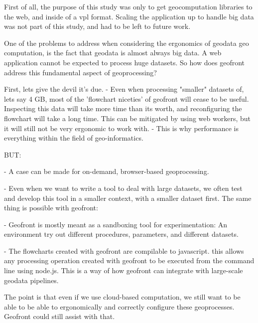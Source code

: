 
First of all, the purpose of this study was only to get geocomputation libraries to the web, and inside of a vpl format. 
Scaling the application up to handle big data was not part of this study, and had to be left to future work.  

One of the problems to address when considering the ergonomics of geodata geo computation, is the fact that geodata is almost always big data. 
A web application cannot be expected to process huge datasets. 
So how does geofront address this fundamental aspect of geoprocessing? 

First, lets give the devil it's due. 
- Even when processing "smaller" datasets of, lets say 4 GB, most of the 'flowchart niceties' of geofront will cease to be useful. Inspecting this data will take more time than its worth, and reconfiguring the flowchart will take a long time. This can be mitigated by using web workers, but it will still not be very ergonomic to work with. 
- This is why performance is everything within the field of geo-informatics.


\begin{note}
  BUT: 

  - A case can be made for on-demand, browser-based geoprocessing. 
  
  - Even when we want to write a tool to deal with large datasets, we often test and develop this tool in a smaller context, with a smaller dataset first. The same thing is possible with geofront: 
  
  - Geofront is mostly meant as a sandboxing tool for experimentation: An environment try out different procedures, parameters, and different datasets. 
  
  - The flowcharts created with geofront are compilable to javascript. this allows any processing operation created with geofront to be executed from the command line using node.js. This is a way of how geofront can integrate with large-scale geodata pipelines. 
  
  The point is that even if we use cloud-based computation, we still want to be able to be able to ergonomically and correctly configure these geoprocesses. Geofront could still assist with that.
  

\end{note}

